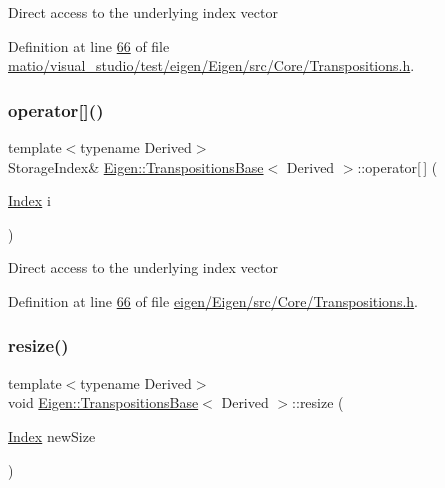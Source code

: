 Direct access to the underlying index vector 

Definition at line \hyperlink{matio_2visual__studio_2test_2eigen_2_eigen_2src_2_core_2_transpositions_8h_source_l00066}{66} of file \hyperlink{matio_2visual__studio_2test_2eigen_2_eigen_2src_2_core_2_transpositions_8h_source}{matio/visual\+\_\+studio/test/eigen/\+Eigen/src/\+Core/\+Transpositions.\+h}.

\mbox{\label{class_eigen_1_1_transpositions_base_a8951554cfdf4840b4bab9864caecc60a}} 
\subsubsection{\texorpdfstring{operator[]()}{operator[]()}\hspace{0.1cm}{\footnotesize\ttfamily [4/4]}}
{\footnotesize\ttfamily template$<$typename Derived$>$ \\
Storage\+Index\& \hyperlink{class_eigen_1_1_transpositions_base}{Eigen\+::\+Transpositions\+Base}$<$ Derived $>$\+::operator\mbox{[}$\,$\mbox{]} (\begin{DoxyParamCaption}\item[{\hyperlink{class_eigen_1_1_transpositions_base_a3f5f06118b419e8e6ccbe49ed5b4c91f}{Index}}]{i }\end{DoxyParamCaption})\hspace{0.3cm}{\ttfamily [inline]}}

Direct access to the underlying index vector 

Definition at line \hyperlink{eigen_2_eigen_2src_2_core_2_transpositions_8h_source_l00066}{66} of file \hyperlink{eigen_2_eigen_2src_2_core_2_transpositions_8h_source}{eigen/\+Eigen/src/\+Core/\+Transpositions.\+h}.

\mbox{\label{class_eigen_1_1_transpositions_base_a3dfa713d74fc1f9a7e589b3d428f7849}} 
\subsubsection{\texorpdfstring{resize()}{resize()}\hspace{0.1cm}{\footnotesize\ttfamily [1/2]}}
{\footnotesize\ttfamily template$<$typename Derived$>$ \\
void \hyperlink{class_eigen_1_1_transpositions_base}{Eigen\+::\+Transpositions\+Base}$<$ Derived $>$\+::resize (\begin{DoxyParamCaption}\item[{\hyperlink{class_eigen_1_1_transpositions_base_a3f5f06118b419e8e6ccbe49ed5b4c91f}{Index}}]{new\+Size }\end{DoxyParamCaption})\hspace{0.3cm}{\ttfamily [inline]}}

